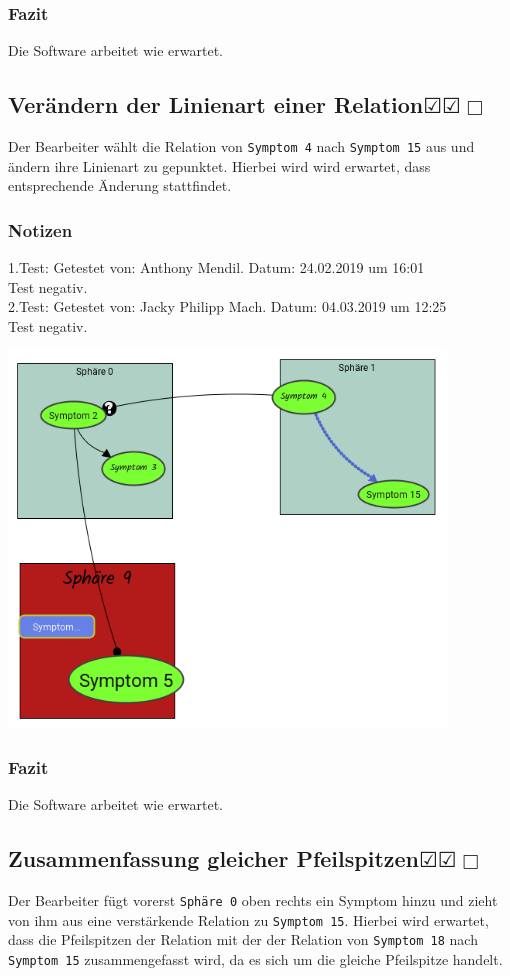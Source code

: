 \documentclass[enabledeprecatedfontcommands]{scrartcl}
\newcommand{\subsectiont}[2]{\subsection[#1]{#1{\normalsize\normalfont #2}}}
\newcommand{\leer}{$\Box$}
\newcommand{\ok}{$\CheckedBox$}
\begin{document}
\subsubsection{Fazit}
Die Software arbeitet wie erwartet.

\subsectiont{Verändern der Linienart einer Relation}{\dotfill\ok\ok\leer}
Der Bearbeiter wählt die Relation von \texttt{Symptom 4} nach \texttt{Symptom 15} aus und ändern ihre Linienart zu gepunktet. Hierbei wird wird erwartet, dass entsprechende Änderung stattfindet. 
\subsubsection{Notizen}
1.Test: Getestet von: Anthony Mendil. Datum: 24.02.2019 um 16:01 \\
Test negativ.\\
2.Test: Getestet von: Jacky Philipp Mach. Datum: 04.03.2019 um 12:25 \\
Test negativ.
\begin{center}
\includegraphics[height=10cm]{3_34.PNG}
\end{center}
\subsubsection{Fazit}
Die Software arbeitet wie erwartet.

\subsectiont{Zusammenfassung gleicher Pfeilspitzen}{\dotfill\ok\ok\leer}
Der Bearbeiter fügt vorerst \texttt{Sphäre 0} oben rechts ein Symptom hinzu und zieht von ihm aus eine verstärkende Relation zu \texttt{Symptom 15}. Hierbei wird erwartet, dass die Pfeilspitzen der Relation mit der der Relation von \texttt{Symptom 18} nach \texttt{Symptom 15} zusammengefasst wird, da es sich um die gleiche Pfeilspitze handelt.
\end{document}
